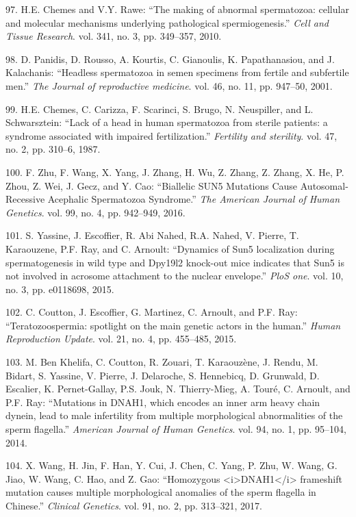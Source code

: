 \documentclass[12pt,a4paper,twoside]{ugathesis}
\theoremstyle{definition}
\theoremstyle{definition}
\theoremstyle{definition}
\theoremstyle{remark}
\begin{document}
\hypertarget{ref-Chemes2010}{}
97. H.E. Chemes and V.Y. Rawe: ``The making of abnormal spermatozoa:
cellular and molecular mechanisms underlying pathological
spermiogenesis.'' \emph{Cell and Tissue Research}. vol. 341, no. 3, pp.
349--357, 2010.

\hypertarget{ref-Panidis2001}{}
98. D. Panidis, D. Rousso, A. Kourtis, C. Gianoulis, K. Papathanasiou,
and J. Kalachanis: ``Headless spermatozoa in semen specimens from
fertile and subfertile men.'' \emph{The Journal of reproductive
medicine}. vol. 46, no. 11, pp. 947--50, 2001.

\hypertarget{ref-Chemes1987}{}
99. H.E. Chemes, C. Carizza, F. Scarinci, S. Brugo, N. Neuspiller, and
L. Schwarsztein: ``Lack of a head in human spermatozoa from sterile
patients: a syndrome associated with impaired fertilization.''
\emph{Fertility and sterility}. vol. 47, no. 2, pp. 310--6, 1987.

\hypertarget{ref-Zhu2016}{}
100. F. Zhu, F. Wang, X. Yang, J. Zhang, H. Wu, Z. Zhang, Z. Zhang, X.
He, P. Zhou, Z. Wei, J. Gecz, and Y. Cao: ``Biallelic SUN5 Mutations
Cause Autosomal-Recessive Acephalic Spermatozoa Syndrome.'' \emph{The
American Journal of Human Genetics}. vol. 99, no. 4, pp. 942--949, 2016.

\hypertarget{ref-Yassine2015}{}
101. S. Yassine, J. Escoffier, R. Abi Nahed, R.A. Nahed, V. Pierre, T.
Karaouzene, P.F. Ray, and C. Arnoult: ``Dynamics of Sun5 localization
during spermatogenesis in wild type and Dpy19l2 knock-out mice indicates
that Sun5 is not involved in acrosome attachment to the nuclear
envelope.'' \emph{PloS one}. vol. 10, no. 3, pp. e0118698, 2015.

\hypertarget{ref-Coutton2015}{}
102. C. Coutton, J. Escoffier, G. Martinez, C. Arnoult, and P.F. Ray:
``Teratozoospermia: spotlight on the main genetic actors in the human.''
\emph{Human Reproduction Update}. vol. 21, no. 4, pp. 455--485, 2015.

\hypertarget{ref-BenKhelifa2014}{}
103. M. Ben Khelifa, C. Coutton, R. Zouari, T. Karaouzène, J. Rendu, M.
Bidart, S. Yassine, V. Pierre, J. Delaroche, S. Hennebicq, D. Grunwald,
D. Escalier, K. Pernet-Gallay, P.S. Jouk, N. Thierry-Mieg, A. Touré, C.
Arnoult, and P.F. Ray: ``Mutations in DNAH1, which encodes an inner arm
heavy chain dynein, lead to male infertility from multiple morphological
abnormalities of the sperm flagella.'' \emph{American Journal of Human
Genetics}. vol. 94, no. 1, pp. 95--104, 2014.

\hypertarget{ref-Wang2017}{}
104. X. Wang, H. Jin, F. Han, Y. Cui, J. Chen, C. Yang, P. Zhu, W. Wang,
G. Jiao, W. Wang, C. Hao, and Z. Gao: ``Homozygous
\textless{}i\textgreater{}DNAH1\textless{}/i\textgreater{} frameshift
mutation causes multiple morphological anomalies of the sperm flagella
in Chinese.'' \emph{Clinical Genetics}. vol. 91, no. 2, pp. 313--321,
2017.
\end{document}
